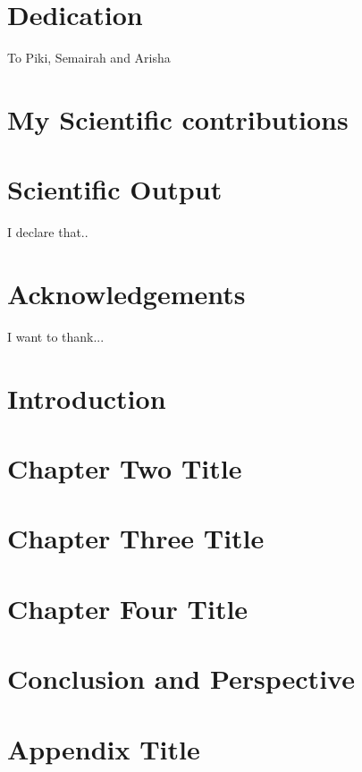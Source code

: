 \documentclass[a4paper, twoside]{report}
\begin{document}
%

\cleardoublepage



\chapter*{Dedication}
To Piki, Semairah and Arisha

\chapter*{My Scientific contributions}


\chapter*{Scientific Output}
I declare that..

\chapter*{Acknowledgements}
I want to thank...

\tableofcontents

\listoffigures

\listoftables

\chapter{Introduction}


\chapter{Chapter Two Title}


\chapter{Chapter Three Title}


\chapter{Chapter Four Title}


\chapter{Conclusion and Perspective}


\appendix
\chapter{Appendix Title}


\printbibliography[notcategory=fullcited]
%
\end{document}
